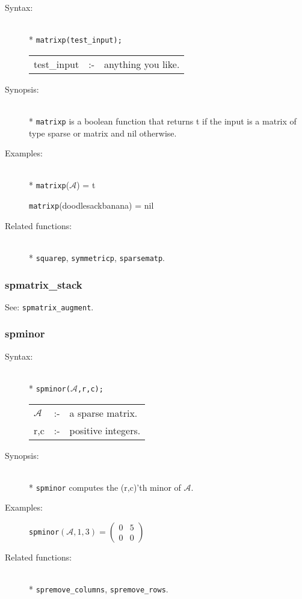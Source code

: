 \begin{description}
\item[Syntax:]\mbox{}\\*
\texttt{matrixp(test\_input);}\\[2mm]
\begin{tabular}{l l l}
test\_input &:-& anything you like.
\end{tabular}

\item[Synopsis:]\mbox{}\\*
\texttt{matrixp} is a boolean function that returns t if
                the input is a matrix of type sparse or matrix and nil otherwise.

\item[Examples:]\mbox{}\\*
\texttt{matrixp}($\mathcal{A}$) = t

\texttt{matrixp}(doodlesackbanana) = nil

\item[Related functions:]\mbox{}\\*
\texttt{squarep}, \texttt{symmetricp}, \texttt{sparsematp}.
\end{description}

\subsubsection{spmatrix\_stack}
\label{sparse:spmatrix_stack}
See: \texttt{spmatrix\_augment}.


\subsubsection{spminor}
\label{sparse:spminor}

\begin{description}
\item[Syntax:]\mbox{}\\*
\texttt{spminor($\mathcal{A}$,r,c);}\\[2mm]
\begin{tabular}{l l l}
$\mathcal{A}$ &:-& a sparse matrix. \\
r,c        &:-& positive integers.
\end{tabular}

\item[Synopsis:]\mbox{}\\*
                \texttt{spminor} computes the (r,c)'th minor of $\mathcal{A}$.

\item[Examples:]
\begin{flushleft}
\texttt{spminor}\((\mathcal{A},1,3) =
        \begin{pmatrix} 0 & 5 \\ 0 & 0  \end{pmatrix}
\)
\end{flushleft}

\item[Related functions:]\mbox{}\\*
 \texttt{spremove\_columns}, \texttt{spremove\_rows}.
\end{description}

